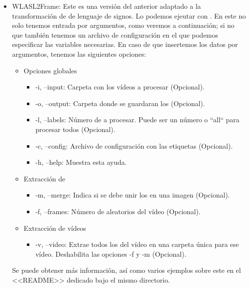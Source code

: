 \begin{itemize}
  \item WLASL2Frame: Este  es una versión del anterior adaptado a la transformación de  de lenguaje de signos. Lo podemos ejeutar con . En este  no solo tenemos entrada por argumentos, como veremos a continuación; si no que también tenemos un archivo de configuración  en el que podemos especificar las variables necesarias. En caso de que insertemos los datos por argumentos, tenemos las siguientes opciones:
        \begin{itemize}
          \item Opciones globales
                \begin{itemize}
                  \item -i, --input: Carpeta con los vídeos a procesar (Opcional).
                  \item -o, --output: Carpeta donde se guardaran los  (Opcional).
                  \item -l, --labels: Número de  a procesar. Puede ser un número o ``all`` para procesar todos (Opcional).
                  \item -c, --config: Archivo de configuración con las etiquetas (Opcional).
                  \item -h, --help: Muestra esta ayuda.
                \end{itemize}

          \item Extracción de 
                \begin{itemize}
                  \item -m, --merge: Indica si se debe unir los  en una imagen (Opcional).
                  \item -f, --frames: Número de  aleatorios del vídeo (Opcional).
                \end{itemize}

          \item Extracción de vídeos
                \begin{itemize}
                  \item -v, --video: Extrae todos los  del vídeo en una carpeta única para ese vídeo. Deshabilita las opciones -f y -m (Opcional).
                \end{itemize}
        \end{itemize}

        Se puede obtener más información, así como varios ejemplos sobre este  en el <<README>> dedicado bajo el mismo directorio.

\end{itemize}

